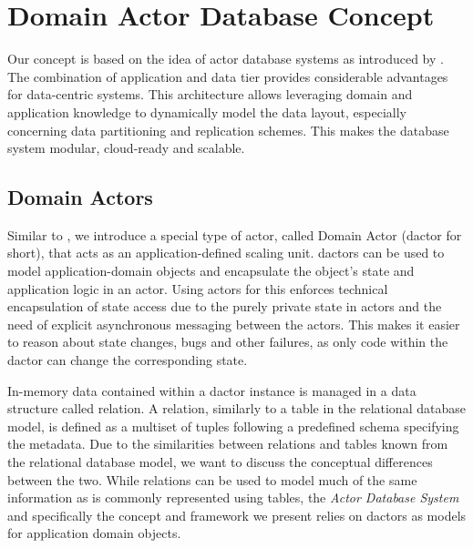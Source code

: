 
\section{Domain Actor Database Concept}\label{sec:concept}
  Our concept is based on the idea of actor database systems as introduced by \citet{manifesto}.
  The combination of application and data tier provides considerable advantages for data-centric systems.
  This architecture allows leveraging domain and application knowledge to dynamically model the data layout, especially concerning data partitioning and replication schemes.
  This makes the database system modular, cloud-ready and scalable.

  \subsection{Domain Actors}\label{sec:dactors}
    Similar to \citet{Shah:reactdb}, we introduce a special type of actor, called Domain Actor (\gls{dactor} for short), that acts as an application-defined scaling unit.
    \Glspl{dactor} can be used to model application-domain objects and encapsulate the object's state and application logic in an actor.
    Using actors for this enforces technical encapsulation of state access due to the purely private state in actors and the need of explicit asynchronous messaging between the actors.
    This makes it easier to reason about state changes, bugs and other failures, as only code within the \gls{dactor} can change the corresponding state.

    In-memory data contained within a \gls{dactor} instance is managed in a data structure called \gls{relation}.
    A \gls{relation}, similarly to a table in the relational database model, is defined as a multiset of tuples following a predefined schema specifying the metadata.
    Due to the similarities between \glspl{relation} and tables known from the relational database model, we want to discuss the conceptual differences between the two.
    While \glspl{relation} can be used to model much of the same information as is commonly represented using tables, the \textit{Actor Database System} and specifically the concept and framework we present relies on \glspl{dactor} as models for application domain objects.

